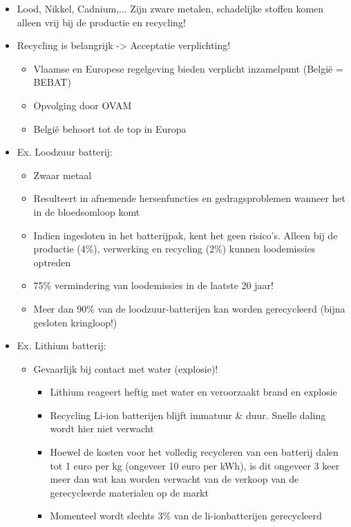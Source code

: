 \documentclass[12pt]{article}
\begin{document}
\begin{itemize}
    \item Lood, Nikkel, Cadnium,... Zijn zware metalen, schadelijke stoffen komen alleen vrij bij de
    productie en recycling!
    \item Recycling is belangrijk -> Acceptatie verplichting!\begin{itemize}
        \item Vlaamse en Europese regelgeving bieden verplicht inzamelpunt (België = BEBAT) 
        \item Opvolging door OVAM 
        \item België behoort tot de top in Europa
    \end{itemize}
    \item Ex. Loodzuur batterij:\begin{itemize}
        \item Zwaar metaal
        \item Resulteert in afnemende hersenfuncties en gedragsproblemen wanneer het in de bloedsomloop komt 
        \item Indien ingesloten in het batterijpak, kent het geen risico's. Alleen bij de productie (4\%), verwerking en recycling (2\%) kunnen loodemissies optreden
        \item 75\% vermindering van loodemissies in de laatste 20 jaar!
        \item Meer dan 90\% van de loodzuur-batterijen kan worden gerecycleerd (bijna gesloten kringloop!)
    \end{itemize}
    \item Ex. Lithium batterij:\begin{itemize}
        \item Gevaarlijk bij contact met water (explosie)!\begin{itemize}
            \item Lithium reageert heftig met water en veroorzaakt brand en explosie
            \item Recycling Li-ion batterijen blijft immatuur \& duur. Snelle daling wordt hier niet verwacht
            \item Hoewel de kosten voor het volledig recycleren van een batterij dalen tot 1 euro
            per kg (ongeveer 10 euro per kWh), is dit ongeveer 3 keer meer dan wat kan worden
            verwacht van de verkoop van de gerecycleerde materialen op de markt
            \item Momenteel wordt slechts 3\% van de li-ionbatterijen gerecycleerd
        \end{itemize}
    \end{itemize}
\end{itemize}
\end{document}
